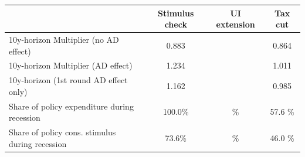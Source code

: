 \begin{tabular}{@{}lccc@{}} 
\toprule 
& Stimulus check    & UI extension    & Tax cut     \\  \midrule 
10y-horizon Multiplier (no AD effect) &0.883  &   & 0.864     \\ 
10y-horizon Multiplier (AD effect) &1.234  &   & 1.011     \\ 
10y-horizon (1st round AD effect only) &1.162  &   & 0.985     \\ 
Share of policy expenditure during recession &100.0\%  & \%  & 57.6 \%    \\ 
Share of policy cons. stimulus during recession &73.6\%  & \%  & 46.0 \%    \\ \bottomrule 
\end{tabular}  
